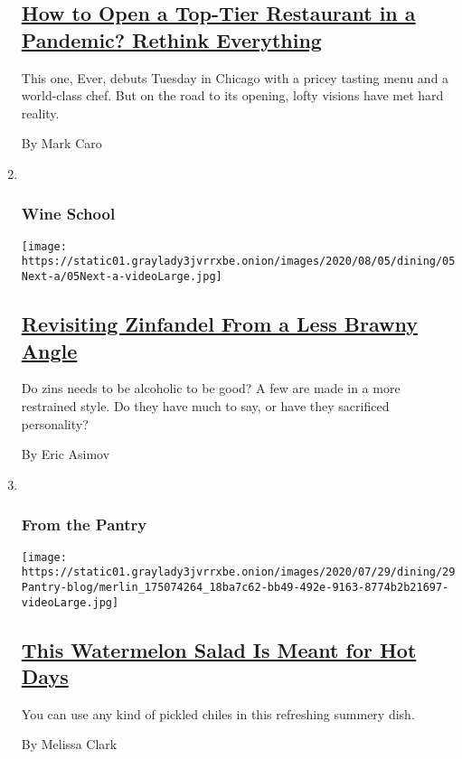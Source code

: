 \begin{enumerate}
  \hypertarget{how-to-open-a-top-tier-restaurant-in-a-pandemic-rethink-everything}{%
  \subsection{\texorpdfstring{\href{/2020/07/28/dining/ever-chicago-restaurant-coronavirus.html}{How
  to Open a Top-Tier Restaurant in a Pandemic? Rethink
  Everything}}{How to Open a Top-Tier Restaurant in a Pandemic? Rethink Everything}}\label{how-to-open-a-top-tier-restaurant-in-a-pandemic-rethink-everything}}

  This one, Ever, debuts Tuesday in Chicago with a pricey tasting menu
  and a world-class chef. But on the road to its opening, lofty visions
  have met hard reality.

  By Mark Caro
\item ~
  \hypertarget{wine-school-1}{%
  \subsubsection{Wine School}\label{wine-school-1}}

  \texttt{[image: https://static01.graylady3jvrrxbe.onion/images/2020/08/05/dining/05Next-a/05Next-a-videoLarge.jpg]}

  \hypertarget{revisiting-zinfandel-from-a-less-brawny-angle}{%
  \subsection{\texorpdfstring{\href{/2020/07/30/dining/drinks/wine-school-assignment-zinfandel.html}{Revisiting
  Zinfandel From a Less Brawny
  Angle}}{Revisiting Zinfandel From a Less Brawny Angle}}\label{revisiting-zinfandel-from-a-less-brawny-angle}}

  Do zins needs to be alcoholic to be good? A few are made in a more
  restrained style. Do they have much to say, or have they sacrificed
  personality?

  By Eric Asimov
\item ~
  \hypertarget{from-the-pantry}{%
  \subsubsection{From the Pantry}\label{from-the-pantry}}

  \texttt{[image: https://static01.graylady3jvrrxbe.onion/images/2020/07/29/dining/29Pantry-blog/merlin\_175074264\_18ba7c62-bb49-492e-9163-8774b2b21697-videoLarge.jpg]}

  \hypertarget{this-watermelon-salad-is-meant-for-hot-days}{%
  \subsection{\texorpdfstring{\href{/2020/07/29/dining/watermelon-salad-recipe.html}{This
  Watermelon Salad Is Meant for Hot
  Days}}{This Watermelon Salad Is Meant for Hot Days}}\label{this-watermelon-salad-is-meant-for-hot-days}}

  You can use any kind of pickled chiles in this refreshing summery
  dish.

  By Melissa Clark
\end{enumerate}

